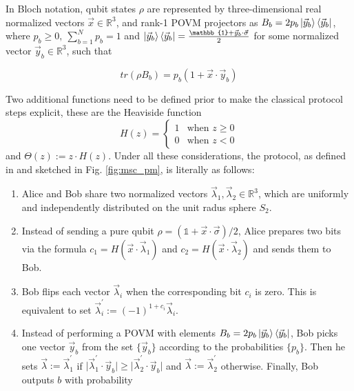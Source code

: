 In Bloch notation, qubit states $\rho$ are represented by three-dimensional real normalized vectors $\vec{x} \in \mathbb{R}^{3}$, and rank-1 POVM projectors as $B_b = 2p_b\ket{\vec{y}_b}\bra{\vec{y}_b}$, where $p_b\ge0,\ \sum_{b=1}^{N}p_b=1$ and $\ket{\vec{y}_b}\bra{\vec{y}_b} = \frac{\mathbb{1} + \vec{y}_b \cdot \vec{\sigma}}{2}$ for some normalized vector $\vec{y}_b \in \mathbb{R}^{3}$, such that

\begin{equation}
tr(\rho B_b) = p_b(1 + \vec{x} \cdot \vec{y}_b) 
\end{equation}

Two additional functions need to be defined prior to make the classical protocol steps explicit, these are the Heaviside function
\begin{equation}
H(z) =
    \begin{cases}
      1 & \text{when $z \ge 0$}\\
      0 & \text{when $z<0$}
    \end{cases} 
\end{equation}
and $\Theta(z) := z \cdot H(z)$. Under all these considerations, the protocol, as defined in \cite{renner2022} and sketched in Fig. \ref{fig:msc_pm}, is literally as follows:
\begin{enumerate}
 \item Alice and Bob share two normalized vectors $\vec{\lambda}_1, \vec{\lambda}_2 \in \mathbb{R}^{3}$, which are uniformly and independently distributed on the unit radus sphere $S_2$.
 \item Instead of sending a pure qubit $\rho = (\mathbb{1} + \vec{x} \cdot \vec{\sigma})/2$, Alice prepares two bits via the formula $c_1= H(\vec{x} \cdot \vec{\lambda}_1)$ and $c_2= H(\vec{x} \cdot \vec{\lambda}_2)$ and sends them to Bob.
 \item Bob flips each vector $\vec{\lambda}_i$ when the corresponding bit $c_i$ is zero. This is equivalent to set $\vec{\lambda}^{\prime}_{i} := (-1)^{1 + c_i} \vec{\lambda}_{i}$.
 \item Instead of performing a POVM with elements $B_b = 2p_b\ket{\vec{y}_b}\bra{\vec{y}_b}$, Bob picks one vector $\vec{y}_b$ from the set $\{\vec{y}_b\}$ according to the probabilities $\{p_b\}$. Then he sets $\vec{\lambda} := \vec{\lambda}^{\prime}_1$ if $\lvert \vec{\lambda}^{\prime}_1 \cdot \vec{y}_b \rvert \ge \lvert \vec{\lambda}^{\prime}_2 \cdot \vec{y}_b \rvert$ and $\vec{\lambda} := \vec{\lambda}^{\prime}_2$ otherwise. Finally, Bob outputs $b$ with probability
\end{enumerate}

